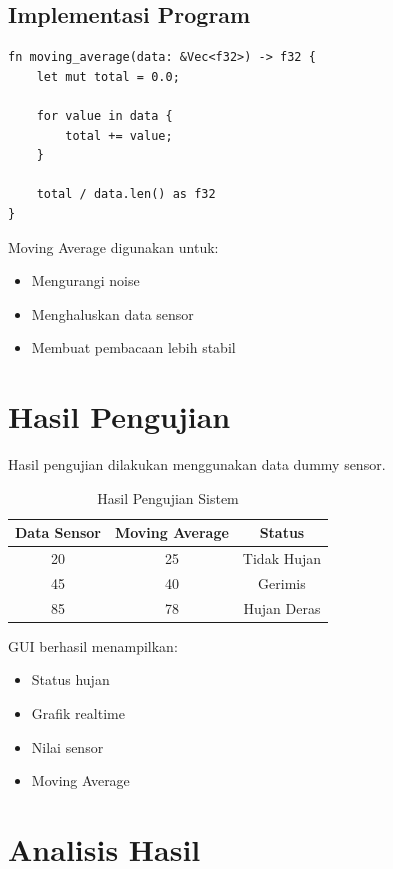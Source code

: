 \documentclass[a4paper,12pt]{article}
\begin{document}
\subsection{Implementasi Program}

\begin{lstlisting}
fn moving_average(data: &Vec<f32>) -> f32 {
    let mut total = 0.0;

    for value in data {
        total += value;
    }

    total / data.len() as f32
}
\end{lstlisting}

Moving Average digunakan untuk:
\begin{itemize}
    \item Mengurangi noise
    \item Menghaluskan data sensor
    \item Membuat pembacaan lebih stabil
\end{itemize}

\section{Hasil Pengujian}

Hasil pengujian dilakukan menggunakan data dummy sensor.

\begin{table}[H]
\centering
\begin{tabular}{|c|c|c|}
\hline
Data Sensor & Moving Average & Status \\ \hline
20 & 25 & Tidak Hujan \\ \hline
45 & 40 & Gerimis \\ \hline
85 & 78 & Hujan Deras \\ \hline
\end{tabular}
\caption{Hasil Pengujian Sistem}
\end{table}

GUI berhasil menampilkan:
\begin{itemize}
    \item Status hujan
    \item Grafik realtime
    \item Nilai sensor
    \item Moving Average
\end{itemize}

\section{Analisis Hasil}
\end{document}
